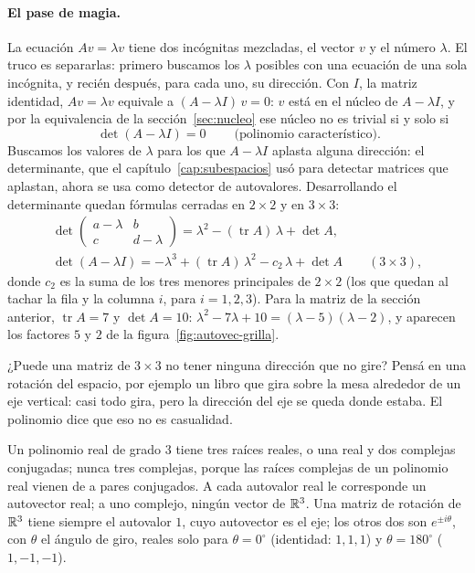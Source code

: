 \paragraph{El pase de magia.} La ecuación \(Av=\lambda v\) tiene dos incógnitas mezcladas,
el vector \(v\) y el número \(\lambda\). El truco es separarlas: primero buscamos los
\(\lambda\) posibles con una ecuación de una sola incógnita, y recién después, para cada uno,
su dirección. Con \(I\), la matriz identidad, \(Av=\lambda v\) equivale a \((A-\lambda I)\,v=0\):
\(v\) está en el núcleo de \(A-\lambda I\), y por la equivalencia de la
sección~\ref{sec:nucleo} ese núcleo no es trivial si y solo si
\[
  \boxed{\ \det(A-\lambda I)=0\ }\qquad\text{(polinomio característico)} .
\]
Buscamos los valores de \(\lambda\) para los que \(A-\lambda I\) aplasta alguna dirección:
el determinante, que el capítulo~\ref{cap:subespacios} usó para detectar matrices que aplastan,
ahora se usa como detector de autovalores.
Desarrollando el determinante quedan fórmulas cerradas en \(2\times2\) y en \(3\times3\):
\begin{gather*}
  \det\begin{pmatrix}a-\lambda&b\\c&d-\lambda\end{pmatrix}
  =\lambda^2-(\operatorname{tr}A)\,\lambda+\det A ,\\
  \det(A-\lambda I)=-\lambda^3+(\operatorname{tr}A)\,\lambda^2-c_2\,\lambda+\det A
  \qquad(3\times3),
\end{gather*}
donde \(c_2\) es la suma de los tres menores principales de \(2\times2\) (los que quedan al
tachar la fila y la columna \(i\), para \(i=1,2,3\)). Para la matriz de la sección
anterior, \(\operatorname{tr}A=7\) y \(\det A=10\): \(\lambda^2-7\lambda+10=(\lambda-5)(\lambda-2)\),
y aparecen los factores \(5\) y \(2\) de la figura~\ref{fig:autovec-grilla}.

¿Puede una matriz de \(3\times3\) no tener ninguna dirección que no gire? Pensá en una
rotación del espacio, por ejemplo un libro que gira sobre la mesa alrededor de un eje vertical:
casi todo gira, pero la dirección del eje se queda donde estaba. El polinomio dice que eso no es
casualidad.

\begin{resultado}
Un polinomio real de grado \(3\) tiene tres raíces reales, o una real y dos complejas
conjugadas; nunca tres complejas, porque las raíces complejas de un polinomio real vienen de a
pares conjugados. A cada autovalor real le corresponde un autovector real; a uno complejo,
ningún vector de \(\mathbb{R}^3\). Una matriz de rotación de \(\mathbb{R}^3\) tiene siempre el autovalor \(1\),
cuyo autovector es el eje; los otros dos son \(e^{\pm i\theta}\), con \(\theta\) el ángulo de
giro, reales solo para \(\theta=0^\circ\) (identidad: \(1,1,1\)) y \(\theta=180^\circ\)
(\(1,-1,-1\)).
\end{resultado}

